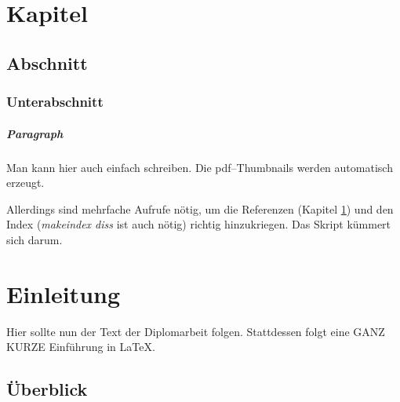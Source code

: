 \documentclass[%
	12pt,		%
	headinclude,	%
	a4paper,	%
	pointlessnumbers, %
	changebar,      %
	liststotoc,	%
	bibtotoc,
	idxtotoc,
	]{diplomarbeit}
\begin{document}
\newpage{\pagestyle{plain}\cleardoublepage}
\rmfamily	%
\renewcommand{\thepage}{\arabic{page}}
\setcounter{page}{1}






%
%
%
%

\chapter{Kapitel}
\label{chap:Kapitel}
\section{Abschnitt}
\label{sec:Abschnitt}
\subsection{Unterabschnitt}
\label{sub:Unterabschnitt}
\paragraph{Paragraph}
\label{par:Paragraph}

Man kann hier auch einfach  schreiben. Die pdf--Thumbnails
werden automatisch erzeugt.

Allerdings sind mehrfache Aufrufe nötig, um die Referenzen (Kapitel
\ref{chap:Kapitel}) und den Index (\textit{makeindex diss} ist auch nötig)
richtig hinzukriegen. Das Skript  kümmert sich darum.

\chapter{Einleitung}

Hier sollte nun der Text der Diplomarbeit folgen.
Stattdessen folgt eine GANZ KURZE Einführung in \LaTeX.

\section{Überblick}
\end{document}
